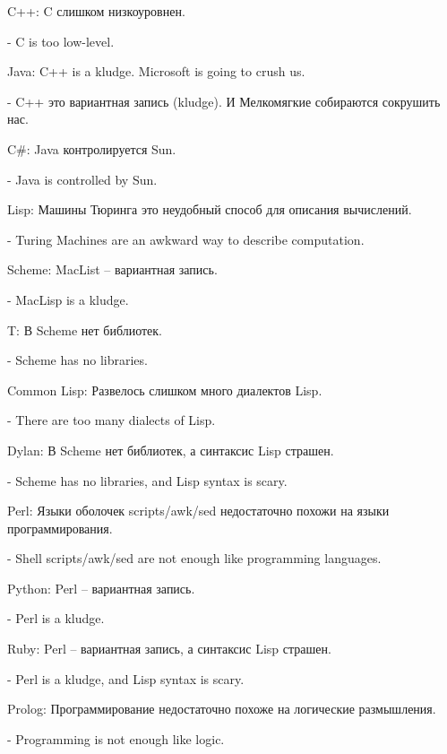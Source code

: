 \documentclass[ebook,12pt,oneside,openany]{memoir}
\begin{document}
C++: C слишком низкоуровнен.

- C is too low-level.

Java: C++ is a kludge. Microsoft is going to crush us.

- C++ это вариантная запись (kludge). И Мелкомягкие собираются
сокрушить нас.

C\#: Java контролируется Sun.

- Java is controlled by Sun.

Lisp: Машины Тюринга это неудобный способ для описания вычислений.

- Turing Machines are an awkward way to describe computation.

Scheme: MacList -- вариантная запись.

- MacLisp is a kludge.

T: В Scheme нет библиотек.

- Scheme has no libraries.

Common Lisp: Развелось слишком много диалектов Lisp.

- There are too many dialects of Lisp.

Dylan: В Scheme нет библиотек, а синтаксис Lisp страшен.

- Scheme has no libraries, and Lisp syntax is scary.

Perl: Языки оболочек scripts/awk/sed недостаточно похожи на языки
программирования.

- Shell scripts/awk/sed are not enough like programming languages.

Python: Perl -- вариантная запись.

- Perl is a kludge.

Ruby: Perl -- вариантная запись, а синтаксис Lisp страшен.

- Perl is a kludge, and Lisp syntax is scary.

Prolog: Программирование недостаточно похоже на логические
размышления.

- Programming is not enough like logic.
\end{document}
